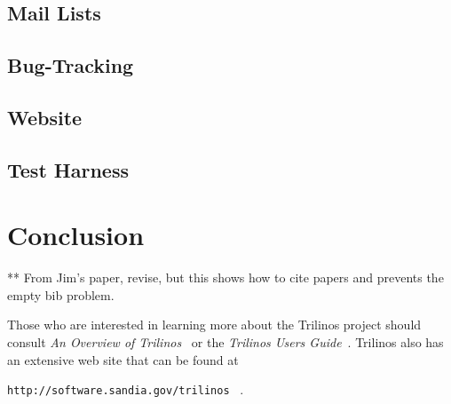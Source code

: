 \documentclass[12pt,relax]{article}
\newcommand{\InlineDirectory}[1]{
  {\hspace{0.01 in}} {\tt #1} {\hspace{0.01 in}}}
\begin{document}
\subsection{Mail Lists}

\subsection{Bug-Tracking}

\subsection{Website}

\subsection{Test Harness}

\clearpage


\section{Conclusion}
\label{Section:Conclusion}

\clearpage


** From Jim's paper, revise, but this shows how to cite papers and prevents the
empty bib problem.

Those who are interested in learning more about the Trilinos project should 
consult {\it An Overview of Trilinos}~\cite{Trilinos-Overview} or the
{\it Trilinos Users Guide}~\cite{Trilinos-Users-Guide}.  Trilinos also has an 
extensive web site that can be found at \newline
\InlineDirectory{http://software.sandia.gov/trilinos}~\cite{Trilinos-home-page}.

\clearpage



%

\end{document}
